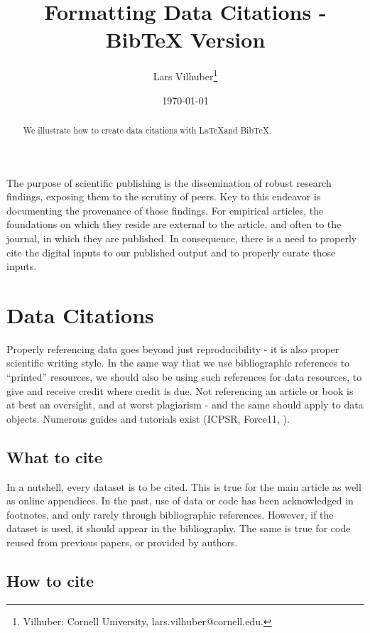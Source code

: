 \documentclass[AEJ]{AEA}
\begin{document}
\title{Formatting Data Citations - BibTeX Version}
\author{Lars Vilhuber\thanks{%
Vilhuber: Cornell University, lars.vilhuber@cornell.edu.}}
\date{\today}
\JEL{}
\Keywords{}

\begin{abstract}
We illustrate how to create data citations with \LaTeX and BibTeX.
\end{abstract}

\maketitle
The purpose of scientific publishing is the dissemination of robust research findings, exposing them to the scrutiny of peers. Key to this endeavor is documenting the provenance of those findings. For empirical articles, the foundations on which they reside are external to the article, and often to the journal, in which they are published.  In consequence, there is a need to properly cite the digital inputs to our published output and to properly curate those inputs.  


\section{Data Citations}
Properly referencing data goes beyond just reproducibility - it is also proper scientific writing style. In the same way that we use bibliographic references to ``printed'' resources, we should also be using such references for data resources, to give and receive credit where credit is due. Not referencing an article or book is at best an oversight, and at worst plagiarism - and the same should apply to data objects. Numerous guides and tutorials exist (ICPSR, Force11, \cite{dataone-l09}).

\subsection{What to cite}

In a nutshell, every dataset is to be cited. This is true for the main article as well as online appendices. In the past, use of data or code has been acknowledged in footnotes, and only rarely through bibliographic references. However,  if the dataset is used, it should appear in the bibliography. The same is true for code reused from previous papers, or provided by authors. 

\subsection{How to cite}
\end{document}
